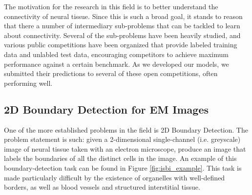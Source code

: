 The motivation for the research in this field is to better understand the connectivity of neural tissue. Since this is such a broad goal, it stands to reason that there a number of intermediary sub-problems that can be tackled to learn about connectivity. Several of the sub-problems have been heavily studied, and various public competitions have been organized that provide labeled training data and unlabled test data, encouraging competitors to achieve maximum performance against a certain benchmark. As we developed our models, we submitted their predictions to several of these open competitions, often performing well.

\medskip

\subsection*{2D Boundary Detection for EM Images}

One of the more established problems in the field is 2D Boundary Detection. The problem statement is such: given a 2-dimensional single-channel (i.e. greyscale) image of neural tissue taken with an electron microscope, produce an image that labels the boundaries of all the distinct cells in the image. An example of this boundary-detection task can be found in Figure \ref{fig:isbi_example}. This task is made particularly difficult by the existence of organelles with well-defined borders, as well as blood vessels and structured interstitial tissue.

